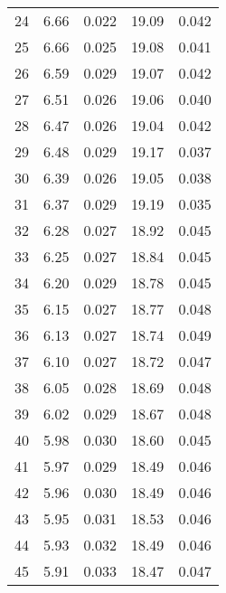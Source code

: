\begin{table}
\begin{tabular}{c|ll|ll}
24 & 6.66 & 0.022 & 19.09 & 0.042 \\
25 & 6.66 & 0.025 & 19.08 & 0.041 \\
26 & 6.59 & 0.029 & 19.07 & 0.042 \\
27 & 6.51 & 0.026 & 19.06 & 0.040 \\
28 & 6.47 & 0.026 & 19.04 & 0.042 \\
29 & 6.48 & 0.029 & 19.17 & 0.037 \\
30 & 6.39 & 0.026 & 19.05 & 0.038 \\
31 & 6.37 & 0.029 & 19.19 & 0.035 \\
32 & 6.28 & 0.027 & 18.92 & 0.045 \\
33 & 6.25 & 0.027 & 18.84 & 0.045 \\
34 & 6.20 & 0.029 & 18.78 & 0.045 \\
35 & 6.15 & 0.027 & 18.77 & 0.048 \\
36 & 6.13 & 0.027 & 18.74 & 0.049 \\
37 & 6.10 & 0.027 & 18.72 & 0.047 \\
38 & 6.05 & 0.028 & 18.69 & 0.048 \\
39 & 6.02 & 0.029 & 18.67 & 0.048 \\
40 & 5.98 & 0.030 & 18.60 & 0.045 \\
41 & 5.97 & 0.029 & 18.49 & 0.046 \\
42 & 5.96 & 0.030 & 18.49 & 0.046 \\
43 & 5.95 & 0.031 & 18.53 & 0.046 \\
44 & 5.93 & 0.032 & 18.49 & 0.046 \\
45 & 5.91 & 0.033 & 18.47 & 0.047 \\
               \hline
        \end{tabular}
    \end{table}
    \clearpage

